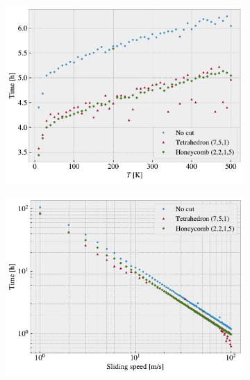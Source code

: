 \begin{figure}[H]
  \centering
  \begin{subfigure}[t]{0.49\textwidth}
      \centering
      \includegraphics[width=\textwidth]{figures/baseline/comp_cost_temp.pdf}
      \caption{}
      \label{fig:comp_temp}
    \end{subfigure}
    \hfill
    \begin{subfigure}[t]{0.49\textwidth}
      \centering
      \includegraphics[width=\textwidth]{figures/baseline/comp_cost_vel.pdf}
      \caption{}
      \label{fig:comp_vel}
    \end{subfigure}
    \hfill
    \begin{subfigure}[t]{0.49\textwidth}
      \centering

\end{subfigure}
\end{figure}
